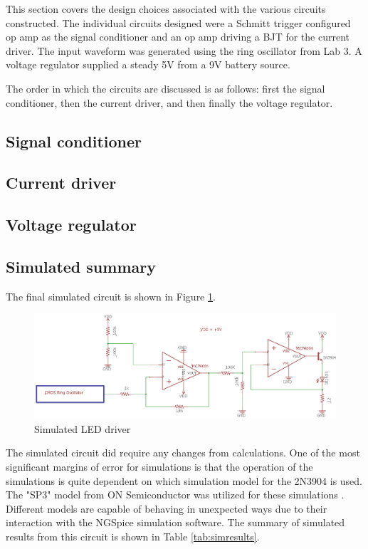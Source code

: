 



This section covers the design choices associated with the various circuits constructed. The individual circuits designed were a Schmitt trigger configured op amp as the signal conditioner and an op amp driving a BJT for the current driver. The input waveform was generated using the ring oscillator from Lab 3. A voltage regulator supplied a steady 5V from a 9V battery source.

The order in which the circuits are discussed is as follows: first the signal conditioner, then the current driver, and then finally the voltage regulator.

%

\subsection{Signal conditioner}


\subsection{Current driver}


\subsection{Voltage regulator}



\subsection{Simulated summary}
The final simulated circuit is shown in Figure \ref{fig:finalschemlab4}.

\begin{figure}[H]
	\centering
	\includegraphics[width=0.7\linewidth]{CircuitDevelopment/FinalschemLab4}
	\caption[Simulated circuit]{Simulated LED driver}
	\label{fig:finalschemlab4}
\end{figure}
The simulated circuit did require any changes from calculations. One of the most significant margins of error for simulations is that the operation of the simulations is quite dependent on which simulation model for the 2N3904 is used. The "SP3" model from ON Semiconductor was utilized for these simulations \cite{spice}. Different models are capable of behaving in unexpected ways due to their interaction with the NGSpice simulation software. The summary of simulated results from this circuit is shown in Table \ref{tab:simresults}.

